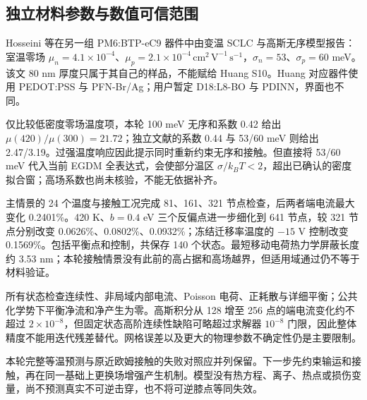 \subsection{{\cjkfont 独立材料参数与数值可信范围}\allowbreak{}}
Hosseini {\cjkfont 等在另一组}\allowbreak{} PM6:BTP-eC9 {\cjkfont 器件中由变温}\allowbreak{} SCLC {\cjkfont 与高斯无序模型报告：室温零场}\allowbreak{} $\mu_n=4.1\times10^{-4}${\cjkfont 、}\allowbreak{}$\mu_p=2.1\times10^{-4}\,\mathrm{cm^2\,V^{-1}\,s^{-1}}${\cjkfont ，}\allowbreak{}$\sigma_n=53${\cjkfont 、}\allowbreak{}$\sigma_p=60$ meV{\cjkfont 。该文}\allowbreak{} 80 nm {\cjkfont 厚度只属于其自己的样品，不能赋给}\allowbreak{} Huang S10{\cjkfont 。}\allowbreak{}Huang {\cjkfont 对应器件使用}\allowbreak{} PEDOT:PSS {\cjkfont 与}\allowbreak{} PFN-Br/Ag{\cjkfont ；用户暂定}\allowbreak{} D18:L8-BO {\cjkfont 与}\allowbreak{} PDINN{\cjkfont ，界面也不同。}\allowbreak{}

{\cjkfont 仅比较低密度零场温度项，本轮}\allowbreak{} 100 meV {\cjkfont 无序和系数}\allowbreak{} 0.42 {\cjkfont 给出}\allowbreak{} $\mu(420)/\mu(300)=21.72${\cjkfont ；独立文献的系数}\allowbreak{} 0.44 {\cjkfont 与}\allowbreak{} 53/60 meV {\cjkfont 则给出}\allowbreak{} 2.47/3.19{\cjkfont 。过强温度响应因此提示同时重新约束无序和接触。但直接将}\allowbreak{} 53/60 meV {\cjkfont 代入当前}\allowbreak{} EGDM {\cjkfont 全表达式，会使部分温区}\allowbreak{} $\sigma/k_BT<2${\cjkfont ，超出已确认的密度拟合窗；高场系数也尚未核验，不能无依据补齐。}\allowbreak{}

{\cjkfont 主情景的}\allowbreak{} 24 {\cjkfont 个温度与接触工况完成}\allowbreak{} 81{\cjkfont 、}\allowbreak{}161{\cjkfont 、}\allowbreak{}321 {\cjkfont 节点检查，后两者端电流最大变化}\allowbreak{} 0.2401\%{\cjkfont 。}\allowbreak{}420 K{\cjkfont 、}\allowbreak{}$b=0.4$ eV {\cjkfont 三个反偏点进一步细化到}\allowbreak{} 641 {\cjkfont 节点，较}\allowbreak{} 321 {\cjkfont 节点分别改变}\allowbreak{} 0.0626\%{\cjkfont 、}\allowbreak{}0.0802\%{\cjkfont 、}\allowbreak{}0.0932\%{\cjkfont ；冻结迁移率温度的}\allowbreak{} $-15$ V {\cjkfont 控制改变}\allowbreak{} 0.1569\%{\cjkfont 。包括平衡点和控制，共保存}\allowbreak{} 140 {\cjkfont 个状态。最短移动电荷热力学屏蔽长度约}\allowbreak{} 3.53 nm{\cjkfont ；本轮接触情景没有此前的高占据和高场越界，但适用域通过仍不等于材料验证。}\allowbreak{}

{\cjkfont 所有状态检查连续性、非局域内部电流、}\allowbreak{}Poisson {\cjkfont 电荷、正耗散与详细平衡；公共化学势下平衡净流和净产生为零。高斯积分从}\allowbreak{} 128 {\cjkfont 增至}\allowbreak{} 256 {\cjkfont 点的端电流变化约不超过}\allowbreak{} $2\times10^{-8}${\cjkfont ，但固定状态高阶连续性缺陷可略超过求解器}\allowbreak{} $10^{-8}$ {\cjkfont 门限，因此整体精度不能用迭代残差替代。网格误差以及更大的物理参数不确定性仍是主要限制。}\allowbreak{}

{\cjkfont 本轮完整等温预测与原近欧姆接触的失败对照应并列保留。下一步先约束输运和接触，再在同一基础上更换场增强产生机制。模型没有热方程、离子、热点或损伤变量，尚不预测真实不可逆击穿，也不将可逆膝点等同失效。}\allowbreak{}

